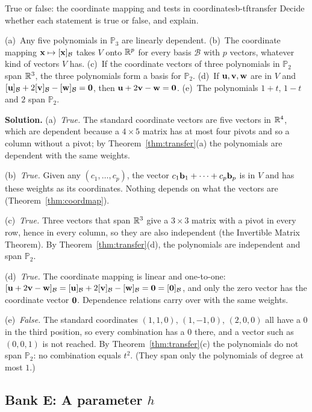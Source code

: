\documentclass[11pt]{article}
\begin{document}
\begin{exmp}{True or false: the coordinate mapping and tests in coordinates}{b-tftransfer}
Decide whether each statement is true or false, and explain.

(a)~Any five polynomials in $\mathbb{P}_3$ are linearly dependent.
(b)~The coordinate mapping $\mathbf{x}\mapsto[\mathbf{x}]_{\mathcal{B}}$ takes $V$ onto $\mathbb{R}^p$ for every basis $\mathcal{B}$ with $p$ vectors, whatever kind of vectors $V$ has.
(c)~If the coordinate vectors of three polynomials in $\mathbb{P}_2$ span $\mathbb{R}^3$, the three polynomials form a basis for $\mathbb{P}_2$.
(d)~If $\mathbf{u},\mathbf{v},\mathbf{w}$ are in $V$ and $[\mathbf{u}]_{\mathcal{B}}+2[\mathbf{v}]_{\mathcal{B}}-[\mathbf{w}]_{\mathcal{B}}=\mathbf{0}$, then $\mathbf{u}+2\mathbf{v}-\mathbf{w}=\mathbf{0}$.
(e)~The polynomials $1+t$, $1-t$ and $2$ span $\mathbb{P}_2$.

\textbf{Solution.} (a)~\emph{True.} The standard coordinate vectors are five vectors in $\mathbb{R}^4$, which are dependent because a $4\times5$ matrix has at most four pivots and so a column without a pivot; by Theorem~\ref{thm:transfer}(a) the polynomials are dependent with the same weights.

(b)~\emph{True.} Given any $(c_1,\dots,c_p)$, the vector $c_1\mathbf{b}_1+\cdots+c_p\mathbf{b}_p$ is in $V$ and has these weights as its coordinates. Nothing depends on what the vectors are (Theorem~\ref{thm:coordmap}).

(c)~\emph{True.} Three vectors that span $\mathbb{R}^3$ give a $3\times3$ matrix with a pivot in every row, hence in every column, so they are also independent (the Invertible Matrix Theorem). By Theorem~\ref{thm:transfer}(d), the polynomials are independent and span $\mathbb{P}_2$.

(d)~\emph{True.} The coordinate mapping is linear and one-to-one: $[\mathbf{u}+2\mathbf{v}-\mathbf{w}]_{\mathcal{B}}=[\mathbf{u}]_{\mathcal{B}}+2[\mathbf{v}]_{\mathcal{B}}-[\mathbf{w}]_{\mathcal{B}}=\mathbf{0}=[\mathbf{0}]_{\mathcal{B}}$, and only the zero vector has the coordinate vector $\mathbf{0}$. Dependence relations carry over with the same weights.

(e)~\emph{False.} The standard coordinates $(1,1,0)$, $(1,-1,0)$, $(2,0,0)$ all have a $0$ in the third position, so every combination has a $0$ there, and a vector such as $(0,0,1)$ is not reached. By Theorem~\ref{thm:transfer}(c) the polynomials do not span $\mathbb{P}_2$: no combination equals $t^2$. (They span only the polynomials of degree at most $1$.)
\end{exmp}

\subsection*{Bank E: A parameter $h$}
\end{document}
